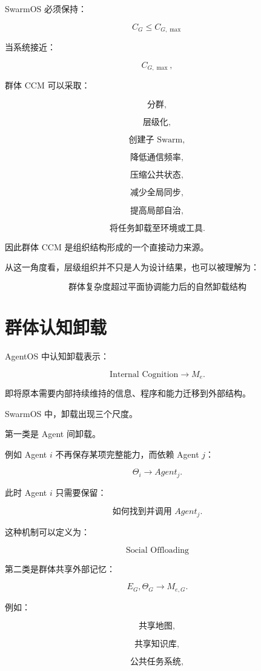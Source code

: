 SwarmOS 必须保持：

\[
\boxed{
C_G
\leq
C_{G,\max}
}
\]

当系统接近：

\[
C_{G,\max},
\]

群体 CCM 可以采取：

\[
\text{分群},
\]

\[
\text{层级化},
\]

\[
\text{创建子 Swarm},
\]

\[
\text{降低通信频率},
\]

\[
\text{压缩公共状态},
\]

\[
\text{减少全局同步},
\]

\[
\text{提高局部自治},
\]

\[
\text{将任务卸载至环境或工具}.
\]

因此群体 CCM 是组织结构形成的一个直接动力来源。

从这一角度看，层级组织并不只是人为设计结果，也可以被理解为：

\[
\boxed{
\text{群体复杂度超过平面协调能力后的自然卸载结构}
}
\]


\section{群体认知卸载}

AgentOS 中认知卸载表示：

\[
\text{Internal Cognition}
\rightarrow
M_e.
\]

即将原本需要内部持续维持的信息、程序和能力迁移到外部结构。

SwarmOS 中，卸载出现三个尺度。

第一类是 Agent 间卸载。

例如 Agent $i$ 不再保存某项完整能力，而依赖 Agent $j$：

\[
\Theta_i
\rightarrow
Agent_j.
\]

此时 Agent $i$ 只需要保留：

\[
\text{如何找到并调用 }Agent_j.
\]

这种机制可以定义为：

\[
\boxed{
\text{Social Offloading}
}
\]

第二类是群体共享外部记忆：

\[
E_G,\Theta_G
\rightarrow
M_{e,G}.
\]

例如：

\[
\text{共享地图},
\]

\[
\text{共享知识库},
\]

\[
\text{公共任务系统},
\]

